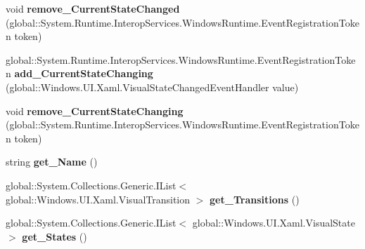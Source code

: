 \begin{DoxyCompactItemize}
\item 
\mbox{\label{interface_windows_1_1_u_i_1_1_xaml_1_1_i_visual_state_group_a851cf8f9cf416f903308f91d9dc794cb}} 
void {\bfseries remove\+\_\+\+Current\+State\+Changed} (global\+::\+System.\+Runtime.\+Interop\+Services.\+Windows\+Runtime.\+Event\+Registration\+Token token)
\item 
\mbox{\label{interface_windows_1_1_u_i_1_1_xaml_1_1_i_visual_state_group_a15af6808561ea3eb12afb9f3dc76cfb7}} 
global\+::\+System.\+Runtime.\+Interop\+Services.\+Windows\+Runtime.\+Event\+Registration\+Token {\bfseries add\+\_\+\+Current\+State\+Changing} (global\+::\+Windows.\+U\+I.\+Xaml.\+Visual\+State\+Changed\+Event\+Handler value)
\item 
\mbox{\label{interface_windows_1_1_u_i_1_1_xaml_1_1_i_visual_state_group_ac006c519047c6976b91b945fef41af29}} 
void {\bfseries remove\+\_\+\+Current\+State\+Changing} (global\+::\+System.\+Runtime.\+Interop\+Services.\+Windows\+Runtime.\+Event\+Registration\+Token token)
\item 
\mbox{\label{interface_windows_1_1_u_i_1_1_xaml_1_1_i_visual_state_group_aefa260736063a0253bd7b1d360e5dcf0}} 
string {\bfseries get\+\_\+\+Name} ()
\item 
\mbox{\label{interface_windows_1_1_u_i_1_1_xaml_1_1_i_visual_state_group_ac26b8d69e72571edcee2b7ad46c3b2b1}} 
global\+::\+System.\+Collections.\+Generic.\+I\+List$<$ global\+::\+Windows.\+U\+I.\+Xaml.\+Visual\+Transition $>$ {\bfseries get\+\_\+\+Transitions} ()
\item 
\mbox{\label{interface_windows_1_1_u_i_1_1_xaml_1_1_i_visual_state_group_a40eeb37ab129bd4e82ee51c795415b77}} 
global\+::\+System.\+Collections.\+Generic.\+I\+List$<$ global\+::\+Windows.\+U\+I.\+Xaml.\+Visual\+State $>$ {\bfseries get\+\_\+\+States} ()
\item 
\mbox{\label{interface_windows_1_1_u_i_1_1_xaml_1_1_i_visual_state_group_a2994cf852dde78fbd8e46dfff9698768}} 

\end{DoxyCompactItemize}
